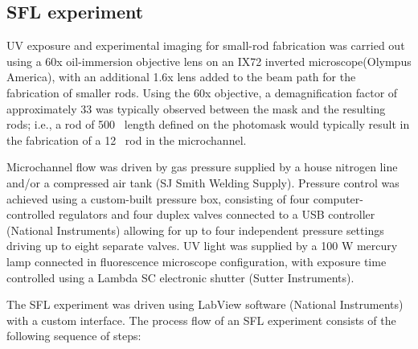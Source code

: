 \subsection{SFL experiment}
\label{sec:sfl-expt-rods}




UV exposure and experimental imaging for small-rod fabrication was carried out using a 60x 
oil-immersion objective lens 
on an IX72 inverted microscope(Olympus America), with an additional 1.6x lens added to the beam path for
the fabrication of smaller rods.  Using the 60x objective, a demagnification factor of approximately 
33 was typically observed between the mask and the resulting rods; i.e., a rod of 500 \microns~length defined on
the photomask would typically result in the fabrication of a 12 \microns~rod in the microchannel.

Microchannel flow was driven by gas pressure supplied by a house nitrogen line and/or a compressed air tank 
(SJ Smith Welding Supply). Pressure control was achieved using a custom-built pressure box, consisting of
four computer-controlled regulators and four duplex valves connected to a USB
controller (National Instruments) allowing for 
up to four independent pressure
settings driving up to eight separate valves. UV light was supplied by a 100 W mercury lamp
connected in fluorescence microscope configuration, with exposure time controlled using a Lambda SC 
electronic shutter (Sutter Instruments).

The SFL experiment was driven using LabView software (National Instruments) with a custom
interface. The process
flow of an SFL experiment consists of the following sequence of steps:

